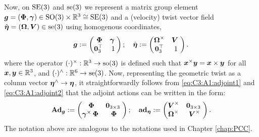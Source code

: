 %
Now, on $\textup{\textrm{SE}}(3)$ and $\textup{\textrm{se}}(3)$ we represent a matrix group element ${\boldsymbol{g}} = ({\boldsymbol{\Phi}}, {\boldsymbol{\gamma}}) \in  \textup{\textrm{SO}}(3) \times \mathbb{R}^3 \cong \textup{\textrm{SE}}(3)$ and a (velocity) twist vector field $\hat{{\boldsymbol{\eta}}} = (\boldsymbol{\Omega},{\boldsymbol{V}}) \in \textup{\textrm{se}}(3)$ using homogenous coordinates,
%
\begin{align}
    {\boldsymbol{g}}  := 
    \begin{pmatrix}
    \; {{\boldsymbol{\Phi}}} & {\boldsymbol{\gamma}} \; \\
    \boldsymbol{0}_3^\top & 1
    \end{pmatrix}; \quad
    \hat{{\boldsymbol{\eta}}} := 
    \begin{pmatrix}
    \boldsymbol{\Omega}^{\times} & \boldsymbol{V} \; \\
    \boldsymbol{0}_3^\top & 1
    \end{pmatrix}.
\end{align}
%
where the operator $(\cdot)^{\times}:\mathbb{R}^3 \to \textup{\textrm{so}}(3)$ is defined such that ${\boldsymbol{x}}^\times{\boldsymbol{y}} = {\boldsymbol{x}} \times {\boldsymbol{y}}$ for all ${\boldsymbol{x}},{\boldsymbol{y}} \in \mathbb{R}^3$, and $(\cdot)^\wedge:\mathbb{R}^6 \to \textup{\textrm{se}}(3)$. Now, representing the geometric twist as a column vector ${\boldsymbol{\eta}}^\wedge \to {\boldsymbol{\eta}}$, it straightforwardly follows from \eqref{eq:C3:A1:adjoint1} and \eqref{eq:C3:A1:adjoint2} that the adjoint actions can be written in the form:
%
\begin{align}
    \textbf{Ad}_{\boldsymbol{g}}  := 
    \begin{pmatrix}
    \; {{\boldsymbol{\Phi}}} & \boldsymbol{0}_{3\times3} \; \\
    {\boldsymbol{\gamma}}^{\times}\,{{\boldsymbol{\Phi}}} & {{\boldsymbol{\Phi}}}
    \end{pmatrix}; \quad
    \textbf{ad}_{{\boldsymbol{\eta}}}  := 
    \begin{pmatrix}
    {\boldsymbol{V}}^{\times} & \boldsymbol{0}_{3\times3} \; \\
    \boldsymbol{\Omega}^{\times} & {\boldsymbol{V}}^{\times} 
    \end{pmatrix}.
\end{align}
The notation above are analogous to the notations used in Chapter \ref{chap:PCC}. \\ \vspace{-3mm}

